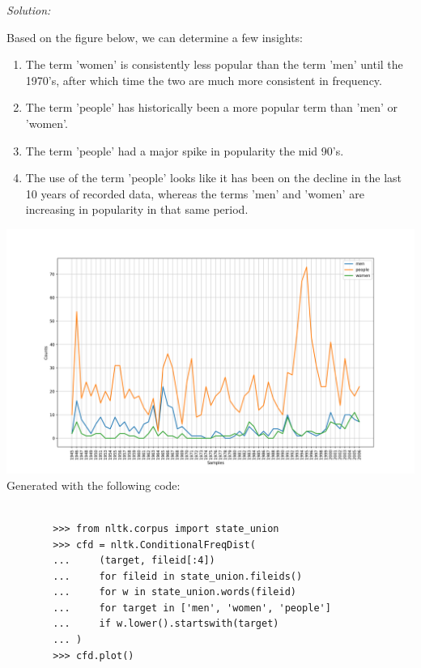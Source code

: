 \documentclass[11pt]{article}
\newenvironment{solution}{
	\vspace{10px}\noindent\emph{Solution:}
}{
	\vspace{10px}
}
\begin{document}
\begin{solution}
	
	Based on the figure below, we can determine a few insights: 
	
	\begin{enumerate}
		
		\item The term 'women' is consistently less popular than the term 'men' until the 1970's, after which time the two are much more consistent in frequency.
		
		\item The term 'people' has historically been a more popular term than 'men' or 'women'.
		
		\item The term 'people' had a major spike in popularity the mid 90's.
		
		\item The use of the term 'people' looks like it has been on the decline in the last 10 years of recorded data, whereas the terms 'men' and 'women' are increasing in popularity in that same period.
	
	\end{enumerate}
	
	\hspace*{-50pt}
	\includegraphics[width=550pt]{state_of_the_union_comp_men_people_women.png}
	Generated with the following code:
	
	\begin{lstlisting}
	
		>>> from nltk.corpus import state_union
		>>> cfd = nltk.ConditionalFreqDist(
		...     (target, fileid[:4])
		...     for fileid in state_union.fileids()
		...     for w in state_union.words(fileid)
		...     for target in ['men', 'women', 'people']
		...     if w.lower().startswith(target)
		... )
		>>> cfd.plot()
	
	\end{lstlisting}
	
\end{solution}  
\end{document}

